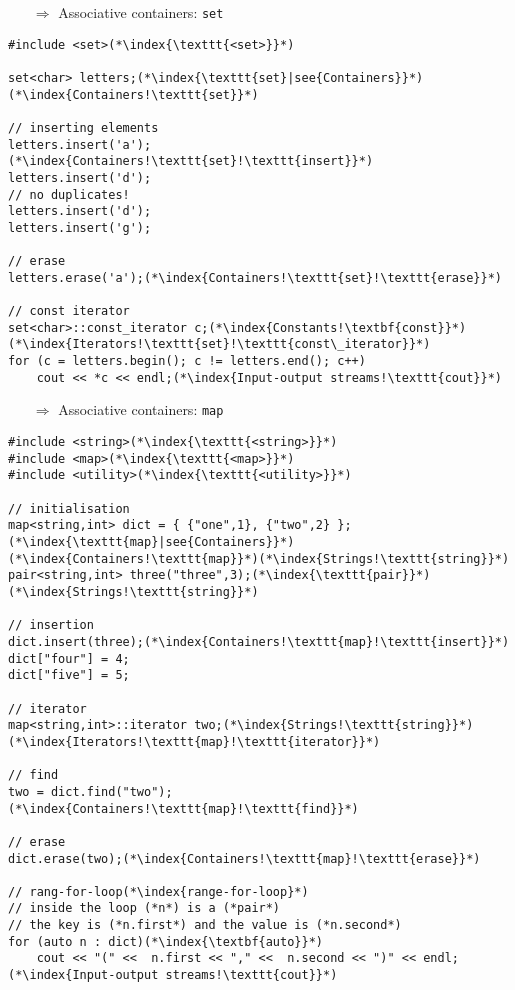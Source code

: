 \documentclass[10pt]{article}
\begin{document}
\begin{enumerate}
\item[$\Rightarrow$] Associative containers: \texttt{set}
\end{enumerate}
\begin{lstlisting}
#include <set>(*\index{\texttt{<set>}}*)

set<char> letters;(*\index{\texttt{set}|see{Containers}}*)(*\index{Containers!\texttt{set}}*)

// inserting elements    
letters.insert('a');(*\index{Containers!\texttt{set}!\texttt{insert}}*)
letters.insert('d');
// no duplicates!
letters.insert('d');
letters.insert('g');

// erase    
letters.erase('a');(*\index{Containers!\texttt{set}!\texttt{erase}}*)

// const iterator 
set<char>::const_iterator c;(*\index{Constants!\textbf{const}}*)(*\index{Iterators!\texttt{set}!\texttt{const\_iterator}}*)
for (c = letters.begin(); c != letters.end(); c++)
    cout << *c << endl;(*\index{Input-output streams!\texttt{cout}}*)
\end{lstlisting}
\begin{enumerate}
\item[$\Rightarrow$] Associative containers: \texttt{map}
\end{enumerate}
\begin{lstlisting}
#include <string>(*\index{\texttt{<string>}}*)
#include <map>(*\index{\texttt{<map>}}*)
#include <utility>(*\index{\texttt{<utility>}}*)

// initialisation
map<string,int> dict = { {"one",1}, {"two",2} };(*\index{\texttt{map}|see{Containers}}*)(*\index{Containers!\texttt{map}}*)(*\index{Strings!\texttt{string}}*)
pair<string,int> three("three",3);(*\index{\texttt{pair}}*)(*\index{Strings!\texttt{string}}*)

// insertion    
dict.insert(three);(*\index{Containers!\texttt{map}!\texttt{insert}}*)
dict["four"] = 4;
dict["five"] = 5;

// iterator    
map<string,int>::iterator two;(*\index{Strings!\texttt{string}}*)(*\index{Iterators!\texttt{map}!\texttt{iterator}}*)

// find    
two = dict.find("two");(*\index{Containers!\texttt{map}!\texttt{find}}*)

// erase    
dict.erase(two);(*\index{Containers!\texttt{map}!\texttt{erase}}*)

// rang-for-loop(*\index{range-for-loop}*)
// inside the loop (*n*) is a (*pair*)
// the key is (*n.first*) and the value is (*n.second*)
for (auto n : dict)(*\index{\textbf{auto}}*)
    cout << "(" <<  n.first << "," <<  n.second << ")" << endl;(*\index{Input-output streams!\texttt{cout}}*)
\end{lstlisting}
%
%
\end{document}
